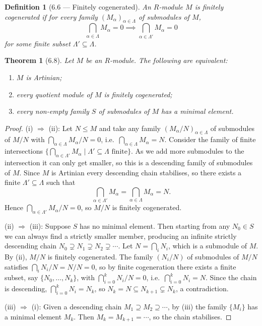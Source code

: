 \documentclass[12pt]{article}
\newtheorem{theorem}{Theorem}
\newtheorem{definition}{Definition}
\begin{document}
\begin{definition}[6.6 — Finitely cogenerated]
An $R$-module $M$ is \emph{finitely cogenerated} if for every family $(M_\alpha)_{\alpha \in \Lambda}$ of submodules of $M$,
\[
  \bigcap_{\alpha \in \Lambda} M_\alpha = 0 \implies \bigcap_{\alpha \in \Lambda'} M_\alpha = 0
\]
for some finite subset $\Lambda' \subseteq \Lambda$.
\end{definition}

\begin{theorem}[6.8]
Let $M$ be an $R$-module. The following are equivalent:
\begin{enumerate}[label=(\roman*)]
  \item $M$ is Artinian;
  \item every quotient module of $M$ is finitely cogenerated;
  \item every non-empty family $S$ of submodules of $M$ has a minimal element.
\end{enumerate}
\end{theorem}

\begin{proof}
(i) $\Rightarrow$ (ii): Let $N \leq M$ and take any family $(M_\alpha/N)_{\alpha \in \Lambda}$ of submodules of $M/N$ with $\bigcap_{\alpha \in \Lambda} M_\alpha/N = 0$, i.e.\ $\bigcap_{\alpha \in \Lambda} M_\alpha = N$. Consider the family of finite intersections $\bigl\{\bigcap_{\alpha \in \Lambda'} M_\alpha \mid \Lambda' \subseteq \Lambda \text{ finite}\bigr\}$. As we add more submodules to the intersection it can only get smaller, so this is a descending family of submodules of $M$. Since $M$ is Artinian every descending chain stabilises, so there exists a finite $\Lambda' \subseteq \Lambda$ such that
\[
  \bigcap_{\alpha \in \Lambda'} M_\alpha = \bigcap_{\alpha \in \Lambda} M_\alpha = N.
\]
Hence $\bigcap_{\alpha \in \Lambda'} M_\alpha/N = 0$, so $M/N$ is finitely cogenerated.

(ii) $\Rightarrow$ (iii): Suppose $S$ has no minimal element. Then starting from any $N_0 \in S$ we can always find a strictly smaller member, producing an infinite strictly descending chain $N_0 \supsetneq N_1 \supsetneq N_2 \supsetneq \cdots$. Let $N = \bigcap_i N_i$, which is a submodule of $M$. By (ii), $M/N$ is finitely cogenerated. The family $(N_i/N)$ of submodules of $M/N$ satisfies $\bigcap_i N_i/N = N/N = 0$, so by finite cogeneration there exists a finite subset, say $\{N_0,\ldots,N_k\}$, with $\bigcap_{i=0}^k N_i/N = 0$, i.e.\ $\bigcap_{i=0}^k N_i = N$. Since the chain is descending, $\bigcap_{i=0}^k N_i = N_k$, so $N_k = N \subseteq N_{k+1} \subsetneq N_k$, a contradiction.

(iii) $\Rightarrow$ (i): Given a descending chain $M_1 \supseteq M_2 \supseteq \cdots$, by (iii) the family $\{M_i\}$ has a minimal element $M_k$. Then $M_k = M_{k+1} = \cdots$, so the chain stabilises.
\end{proof}
\end{document}
